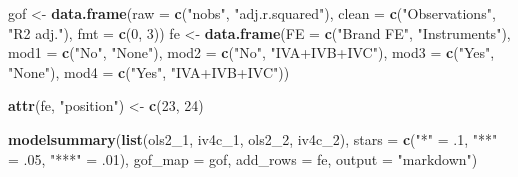 \documentclass[
]{article}
\newenvironment{Shaded}{\begin{snugshade}}{\end{snugshade}}
\newcommand{\AttributeTok}[1]{\textcolor[rgb]{0.13,0.29,0.53}{#1}}
\newcommand{\DecValTok}[1]{\textcolor[rgb]{0.00,0.00,0.81}{#1}}
\newcommand{\FunctionTok}[1]{\textcolor[rgb]{0.13,0.29,0.53}{\textbf{#1}}}
\newcommand{\NormalTok}[1]{#1}
\newcommand{\OtherTok}[1]{\textcolor[rgb]{0.56,0.35,0.01}{#1}}
\newcommand{\StringTok}[1]{\textcolor[rgb]{0.31,0.60,0.02}{#1}}
\begin{document}
\begin{Shaded}
\begin{Highlighting}[]
\NormalTok{gof }\OtherTok{\textless{}{-}} \FunctionTok{data.frame}\NormalTok{(}\AttributeTok{raw =} \FunctionTok{c}\NormalTok{(}\StringTok{"nobs"}\NormalTok{, }\StringTok{"adj.r.squared"}\NormalTok{),}
                  \AttributeTok{clean =} \FunctionTok{c}\NormalTok{(}\StringTok{"Observations"}\NormalTok{, }\StringTok{"R2 adj."}\NormalTok{),}
                  \AttributeTok{fmt =} \FunctionTok{c}\NormalTok{(}\DecValTok{0}\NormalTok{, }\DecValTok{3}\NormalTok{))}
\NormalTok{fe }\OtherTok{\textless{}{-}} \FunctionTok{data.frame}\NormalTok{(}\AttributeTok{FE =} \FunctionTok{c}\NormalTok{(}\StringTok{"Brand FE"}\NormalTok{, }\StringTok{"Instruments"}\NormalTok{),}
                 \AttributeTok{mod1 =} \FunctionTok{c}\NormalTok{(}\StringTok{"No"}\NormalTok{, }\StringTok{"None"}\NormalTok{),}
                 \AttributeTok{mod2 =} \FunctionTok{c}\NormalTok{(}\StringTok{"No"}\NormalTok{, }\StringTok{"IVA+IVB+IVC"}\NormalTok{),}
                 \AttributeTok{mod3 =} \FunctionTok{c}\NormalTok{(}\StringTok{"Yes"}\NormalTok{, }\StringTok{"None"}\NormalTok{),}
                 \AttributeTok{mod4 =} \FunctionTok{c}\NormalTok{(}\StringTok{"Yes"}\NormalTok{, }\StringTok{"IVA+IVB+IVC"}\NormalTok{))}

\FunctionTok{attr}\NormalTok{(fe, }\StringTok{"position"}\NormalTok{) }\OtherTok{\textless{}{-}} \FunctionTok{c}\NormalTok{(}\DecValTok{23}\NormalTok{, }\DecValTok{24}\NormalTok{)}

\FunctionTok{modelsummary}\NormalTok{(}\FunctionTok{list}\NormalTok{(ols2\_1, iv4c\_1, ols2\_2, iv4c\_2),}
              \AttributeTok{stars =} \FunctionTok{c}\NormalTok{(}\StringTok{"*"} \OtherTok{=}\NormalTok{ .}\DecValTok{1}\NormalTok{, }\StringTok{"**"} \OtherTok{=}\NormalTok{ .}\DecValTok{05}\NormalTok{, }\StringTok{"***"} \OtherTok{=}\NormalTok{ .}\DecValTok{01}\NormalTok{),}
              \AttributeTok{gof\_map =}\NormalTok{ gof, }\AttributeTok{add\_rows =}\NormalTok{ fe, }\AttributeTok{output =} \StringTok{"markdown"}\NormalTok{)}
\end{Highlighting}
\end{Shaded}
\end{document}
